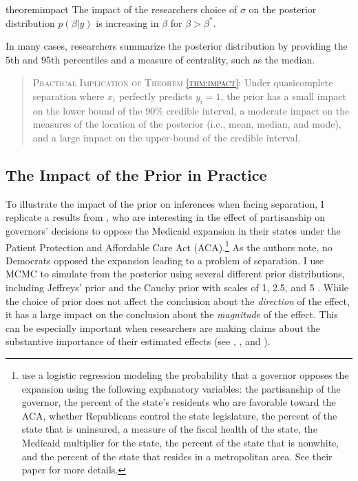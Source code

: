 \documentclass[12pt]{article}
\begin{document}
\begin{restatable}{theorem}{impact}\label{thm:impact}
The impact of the researchers choice of $\sigma$ on the posterior distribution $p(\beta | y)$ is increasing in $\beta$ for $\beta> \beta^*$. 
\end{restatable}

In many cases, researchers summarize the posterior distribution by providing the 5th and 95th percentiles and a measure of centrality, such as the median.

\begin{quote}
\textsc{Practical Implication of Theorem \ref{thm:impact}:} Under quasicomplete separation where $x_i$ perfectly predicts $y_i = 1$, the prior has a small impact on the lower bound of the 90\% credible interval, a moderate impact on the measures of the location of the posterior (i.e., mean, median, and mode), and a large impact on the upper-bound of the credible interval.
\end{quote}

\subsection*{The Impact of the Prior in Practice}

To illustrate the impact of the prior on inferences when facing separation, I replicate a results from \cite{BarrilleauxRainey2014}, who are interesting in the effect of partisanship on governors' decisions to oppose the Medicaid expansion in their states under the Patient Protection and Affordable Care Act (ACA).\footnote{\cite{BarrilleauxRainey2014} use a logistic regression modeling the probability that a governor opposes the expansion using the following explanatory variables: the partisanship of the governor, the percent of the state's residents who are favorable toward the ACA, whether Republicans control the state legislature, the percent of the state that is uninsured, a measure of the fiscal health of the state, the Medicaid multiplier for the state, the percent of the state that is nonwhite, and the percent of the state that resides in a metropolitan area. See their paper for more details.} As the authors note, no Democrats opposed the expansion leading to a problem of separation. I use MCMC to simulate from the posterior using several different prior distributions, including Jeffreys' prior \citep{Zorn2005} and the Cauchy prior with scales of 1, 2.5, and 5 \citep{Gelmanetal2008}. While the choice of prior does not affect the conclusion about the \emph{direction} of the effect, it has a large impact on the conclusion about the \emph{magnitude} of the effect. This can be especially important when researchers are making claims about the substantive importance of their estimated effects (see \citealt{Rainey2014}, \citealt{Gross2014}, and \citealt{McCaskeyRainey2014}).
\end{document}
